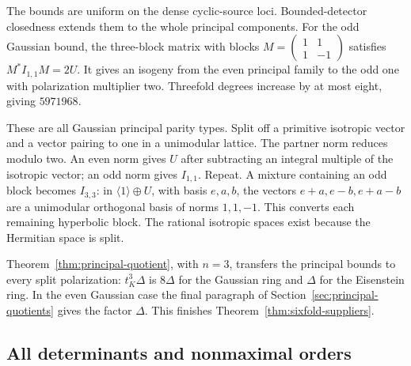 \documentclass[11pt]{article}
\theoremstyle{definition}
\theoremstyle{remark}
\begin{document}
The bounds are uniform on the dense cyclic-source loci. Bounded-detector closedness extends them to the whole principal components. For the odd Gaussian bound, the three-block matrix with blocks $M=\left(\begin{smallmatrix}1&1\\1&-1\end{smallmatrix}\right)$ satisfies $M^*I_{1,1}M=2U$. It gives an isogeny from the even principal family to the odd one with polarization multiplier two. Threefold degrees increase by at most eight, giving $5971968$.

These are all Gaussian principal parity types. Split off a primitive isotropic vector and a vector pairing to one in a unimodular lattice. The partner norm reduces modulo two. An even norm gives $U$ after subtracting an integral multiple of the isotropic vector; an odd norm gives $I_{1,1}$. Repeat. A mixture containing an odd block becomes $I_{3,3}$: in $\langle1\rangle\oplus U$, with basis $e,a,b$, the vectors $e+a,e-b,e+a-b$ are a unimodular orthogonal basis of norms $1,1,-1$. This converts each remaining hyperbolic block. The rational isotropic spaces exist because the Hermitian space is split.

Theorem~\ref{thm:principal-quotient}, with $n=3$, transfers the principal bounds to every split polarization: $t_K^3\Delta$ is $8\Delta$ for the Gaussian ring and $\Delta$ for the Eisenstein ring. In the even Gaussian case the final paragraph of Section~\ref{sec:principal-quotients} gives the factor $\Delta$. This finishes Theorem~\ref{thm:sixfold-suppliers}.

\subsection{All determinants and nonmaximal orders}
\end{document}
